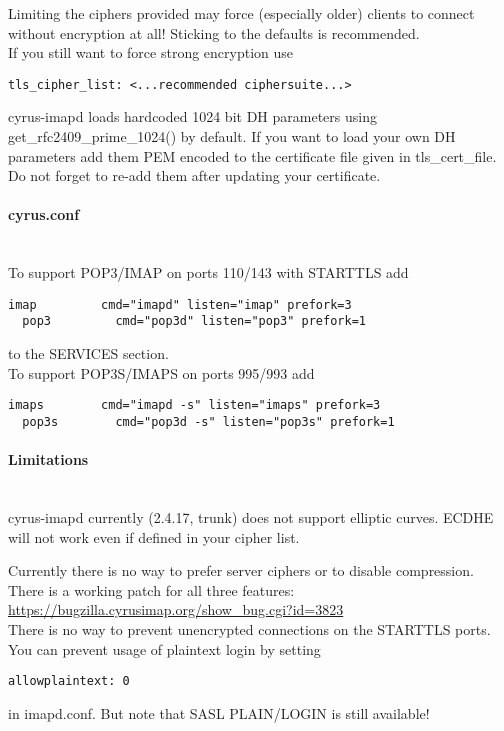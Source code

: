 Limiting the ciphers provided may force (especially older) clients to connect without encryption at all! Sticking to the defaults is recommended.\\

If you still want to force strong encryption use
\begin{lstlisting}[breaklines]
  tls_cipher_list: <...recommended ciphersuite...>
\end{lstlisting}

cyrus-imapd loads hardcoded 1024 bit DH parameters using get\_rfc2409\_prime\_1024() by default. If you want to load your own DH parameters add them PEM encoded to the certificate file given in tls\_cert\_file. Do not forget to re-add them after updating your certificate.

\paragraph*{cyrus.conf}\mbox{}\\

To support POP3/IMAP on ports 110/143 with STARTTLS add
\begin{lstlisting}[breaklines]
  imap         cmd="imapd" listen="imap" prefork=3
  pop3         cmd="pop3d" listen="pop3" prefork=1
\end{lstlisting}
to the SERVICES section.\\

To support POP3S/IMAPS on ports 995/993 add
\begin{lstlisting}[breaklines]
  imaps        cmd="imapd -s" listen="imaps" prefork=3
  pop3s        cmd="pop3d -s" listen="pop3s" prefork=1
\end{lstlisting}

\paragraph*{Limitations}\mbox{}\\

cyrus-imapd currently (2.4.17, trunk) does not support elliptic curves. ECDHE will not work even if defined in your cipher list.

Currently there is no way to prefer server ciphers or to disable compression.\\

There is a working patch for all three features:
\url{https://bugzilla.cyrusimap.org/show_bug.cgi?id=3823}\\

There is no way to prevent unencrypted connections on the STARTTLS ports. You can prevent usage of plaintext login by setting
\begin{lstlisting}[breaklines]
  allowplaintext: 0
\end{lstlisting}
in imapd.conf. But note that SASL PLAIN/LOGIN is still available!\\




